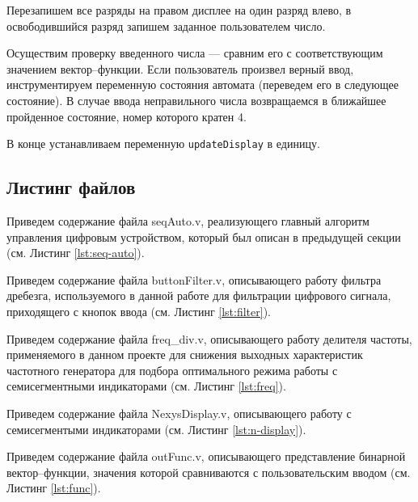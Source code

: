\documentclass[a4paper,14pt]{extarticle}
\begin{document}
Перезапишем все разряды на правом дисплее на один разряд влево, в освободившийся разряд запишем заданное пользователем число. 

Осуществим проверку введенного числа --- сравним его с соответствующим значением вектор--функции. Если пользователь произвел верный ввод, инструментируем переменную состояния автомата (переведем его в следующее состояние). В случае ввода неправильного числа возвращаемся в ближайшее пройденное состояние, номер которого кратен 4. 

В конце устанавливаем переменную \texttt{updateDisplay} в единицу.

\subsection*{Листинг файлов}
Приведем содержание файла seqAuto.v, реализующего главный алгоритм управления цифровым устройством, который был описан в предыдущей секции (см. Листинг \ref{lst:seq-auto}).



Приведем содержание файла buttonFilter.v, описывающего работу фильтра дребезга, используемого в данной работе для фильтрации цифрового сигнала, приходящего с кнопок ввода (см. Листинг \ref{lst:filter}).




Приведем содержание файла freq\_div.v, описывающего работу делителя частоты, применяемого в данном проекте для снижения выходных характеристик частотного генератора для подбора оптимального режима работы с семисегментными индикаторами (см. Листинг \ref{lst:freq}).



Приведем содержание файла NexysDisplay.v, описывающего работу с семисегментыми индикаторами (см. Листинг \ref{lst:n-display}).



Приведем содержание файла outFunc.v, описывающего представление бинарной вектор--функции, значения которой сравниваются с пользовательским вводом (см. Листинг \ref{lst:func}).
\end{document}
